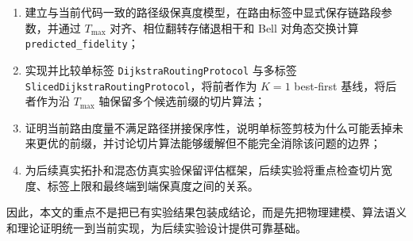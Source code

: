 \begin{enumerate}
  \item 建立与当前代码一致的路径级保真度模型，在路由标签中显式保存链路段参数，并通过 $T_{\max}$ 对齐、相位翻转存储退相干和 Bell 对角态交换计算 \texttt{predicted\_fidelity}；
  \item 实现并比较单标签 \texttt{DijkstraRoutingProtocol} 与多标签 \texttt{SlicedDijkstraRoutingProtocol}，将前者作为 $K=1$ best-first 基线，将后者作为沿 $T_{\max}$ 轴保留多个候选前缀的切片算法；
  \item 证明当前路由度量不满足路径拼接保序性，说明单标签剪枝为什么可能丢掉未来更优的前缀，并讨论切片算法能够缓解但不能完全消除该问题的边界；
  \item 为后续真实拓扑和混态仿真实验保留评估框架，后续实验将重点检查切片宽度、标签上限和最终端到端保真度之间的关系。
\end{enumerate}

因此，本文的重点不是把已有实验结果包装成结论，而是先把物理建模、算法语义和理论证明统一到当前实现，为后续实验设计提供可靠基础。
